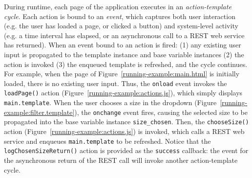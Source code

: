{During runtime, each page of the application executes in an \textit{action-template cycle}. Each action is bound to an \textit{event}, which captures both user interaction (e.g. the user has loaded a page, or clicked a button) and system-level activity (e.g. a time interval has elapsed, or an asynchronous call to a REST web service has returned). When an event bound to an action is fired: (1) any existing user input is propagated to the template instance and base variable instances (2) the action is invoked (3) the enqueued template is refreshed, and the cycle continues. For example, when the page of Figure~\ref{running-example:main.html} is initially loaded, there is no existing user input. Thus, the \texttt{onload} event invokes the \texttt{loadPage()} action (Figure~\ref{running-example:actions.js}), which simply displays \texttt{main.template}. When the user chooses a size in the dropdown (Figure~\ref{running-example:filter.template}), the \texttt{onchange} event fires, causing the selected size to be propagated into the base variable instance \texttt{size\_chosen}. Then, the \texttt{chooseSize()} action (Figure~\ref{running-example:actions.js}) is invoked, which calls a REST web service and enqueues \texttt{main.template} to be refreshed. Notice that the \texttt{logChosenSizeReturn()} action is provided as the \texttt{success} callback: the event for the asynchronous return of the REST call will invoke another action-template cycle.


}
